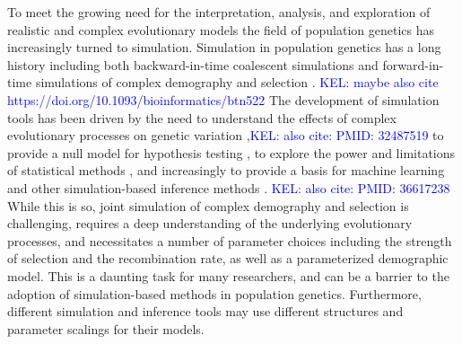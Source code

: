 \documentclass[hidelinks]{article}
\newcommand{\kelcomment}[1]{\textcolor{blue}{KEL: #1}}
\begin{document}
    To meet the growing need for the interpretation,
    analysis, and exploration of realistic and complex evolutionary models
    the field of population genetics has increasingly turned to simulation.
    Simulation in population genetics has a long history 
    including both backward-in-time coalescent simulations
    \citep{kingman1982genealogy,hudson1983testing, hudson1990gene}
    and forward-in-time simulations of complex demography and selection
    \citep[e.g.,][]{gillespie1984molecular,thornton2014c++, haller2019slim}.  \kelcomment{maybe also cite https://doi.org/10.1093/bioinformatics/btn522}
    The development of simulation tools has been driven by the need to
    understand the effects of complex evolutionary processes on genetic
    variation \citep[e.g.,][]{galloway2020few},\kelcomment{also cite: PMID: 32487519 } to provide a null model for hypothesis testing
    \citep[e.g.,][]{hudson1992statistical,hudson1994evidence,sabeti2002detecting},
    to explore the power and limitations of statistical methods \citep[e.g.,][]{przeworski2002signature},
    and increasingly to provide a basis for machine learning and other
    simulation-based inference methods \citep[e.g.,][]{beaumont2002approximate,pavlidis2010searching,lin2011distinguishing,kern2018diplos,mughal2019localizing,sanchez2021deep,wang2021automatic}. \kelcomment{also cite: PMID: 36617238 }
    While this is so, joint simulation of complex demography and selection
    is challenging,  requires a deep understanding of the underlying
    evolutionary processes, and necessitates a number of parameter choices including
    the strength of selection and the
    recombination rate, as well as a parameterized demographic model.
    This is a daunting task for many researchers, and can be a barrier to
    the adoption of simulation-based methods in population genetics.
    Furthermore, different simulation and inference tools may use different structures
    and parameter scalings for their models.
\end{document}
